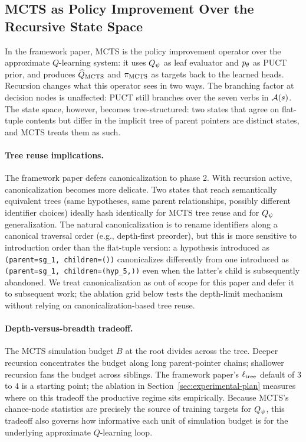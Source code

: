 \subsection{MCTS as Policy Improvement Over the Recursive State Space}
\label{sec:method-mcts}

In the framework paper, MCTS is the policy improvement operator over
the approximate $Q$-learning system: it uses $Q_{\psi}$ as leaf evaluator
and $p_{\theta}$ as PUCT prior, and produces $\widehat{Q}_{\mathrm{MCTS}}$ and $\pi_{\mathrm{MCTS}}$ as
targets back to the learned heads. Recursion changes what this
operator sees in two ways. The branching factor at decision nodes is
unaffected: PUCT still branches over the seven verbs in $\mathcal{A}(s)$.
The state space, however, becomes tree-structured: two states that
agree on flat-tuple contents but differ in the implicit tree of parent
pointers are distinct states, and MCTS treats them as such.

\paragraph{Tree reuse implications.}
The framework paper defers canonicalization to phase 2. With recursion
active, canonicalization becomes more delicate. Two states that reach
semantically equivalent trees (same hypotheses, same parent
relationships, possibly different identifier choices) ideally hash
identically for MCTS tree reuse and for $Q_{\psi}$ generalization. The
natural canonicalization is to rename identifiers along a canonical
traversal order (e.g., depth-first preorder), but this is more
sensitive to introduction order than the flat-tuple version: a
hypothesis introduced as \texttt{(parent=sg\_1, children=())}
canonicalizes differently from one introduced as
\texttt{(parent=sg\_1, children=(hyp\_5,))} even when the latter's
child is subsequently abandoned. We treat canonicalization as out of
scope for this paper and defer it to subsequent work; the ablation
grid below tests the depth-limit mechanism without relying on
canonicalization-based tree reuse.

\paragraph{Depth-versus-breadth tradeoff.}
The MCTS simulation budget $B$ at the root divides across the tree.
Deeper recursion concentrates the budget along long parent-pointer
chains; shallower recursion fans the budget across siblings. The
framework paper's $\ell_{\mathrm{tree}}$ default of $3$ to $4$ is a starting
point; the ablation in Section~\ref{sec:experimental-plan} measures
where on this tradeoff the productive regime sits empirically. Because
MCTS's chance-node statistics are precisely the source of training
targets for $Q_{\psi}$, this tradeoff also governs how informative each
unit of simulation budget is for the underlying approximate
$Q$-learning loop.


